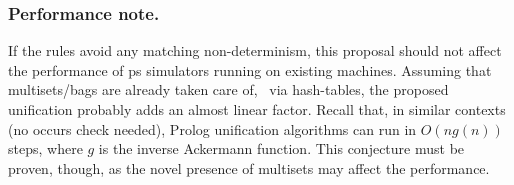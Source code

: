\subsubsection{Performance note.}
If the rules avoid any matching non-determinism, 
this proposal should not affect the performance of \gls{ps} simulators running on existing machines.
Assuming that multisets/bags are already taken care of, \eg{}~via hash-tables,
the proposed unification probably adds an almost linear factor.
Recall that, in similar contexts (no occurs check needed), 
Prolog unification algorithms can run in \(O(n g(n))\) steps,
where \(g\) is the inverse Ackermann function.
This conjecture must be proven, though, 
as the novel presence of multisets may affect the performance.

